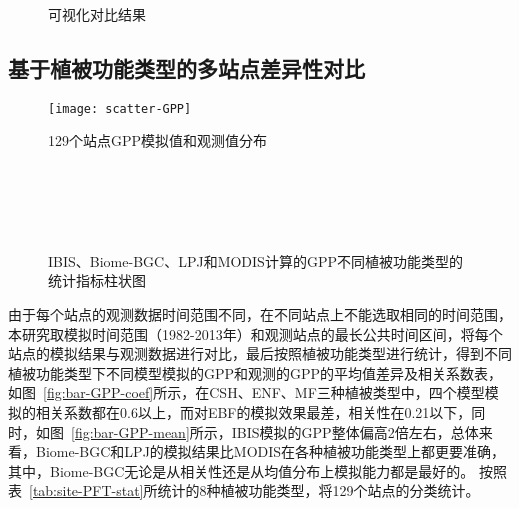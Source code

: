 \begin{figure}[!htbp]
    \centering
    \hfill
    \hfill
    \caption{可视化对比结果}
    \label{fig:visual-cmp-rst}
\end{figure}

\subsection{基于植被功能类型的多站点差异性对比}
\begin{figure}[!htbp]
    \centering
    \begin{minipage}[b]{1\textwidth}
      \centering
      \texttt{[image: scatter-GPP]}
      \caption{129个站点GPP模拟值和观测值分布}
      \label{fig:api-gateway-children}
    \end{minipage} \\
    \vspace{5pt}
    \begin{minipage}[b]{1\textwidth}
      \centering
      \hfill
       \\
      \hfill
       \\
      \caption{IBIS、Biome-BGC、LPJ和MODIS计算的GPP不同植被功能类型的统计指标柱状图}
      \label{fig:bar-GPP-cmp}
    \end{minipage}
\end{figure}

由于每个站点的观测数据时间范围不同，在不同站点上不能选取相同的时间范围，本研究取模拟时间范围（1982-2013年）和观测站点的最长公共时间区间，将每个站点的模拟结果与观测数据进行对比，最后按照植被功能类型进行统计，得到不同植被功能类型下不同模型模拟的GPP和观测的GPP的平均值差异及相关系数表，如图~\ref{fig:bar-GPP-coef}所示，在CSH、ENF、MF三种植被类型中，四个模型模拟的相关系数都在0.6以上，而对EBF的模拟效果最差，相关性在0.21以下，同时，如图~\ref{fig:bar-GPP-mean}所示，IBIS模拟的GPP整体偏高2倍左右，总体来看，Biome-BGC和LPJ的模拟结果比MODIS在各种植被功能类型上都更要准确，其中，Biome-BGC无论是从相关性还是从均值分布上模拟能力都是最好的。
按照表~\ref{tab:site-PFT-stat}所统计的8种植被功能类型，将129个站点的分类统计。



